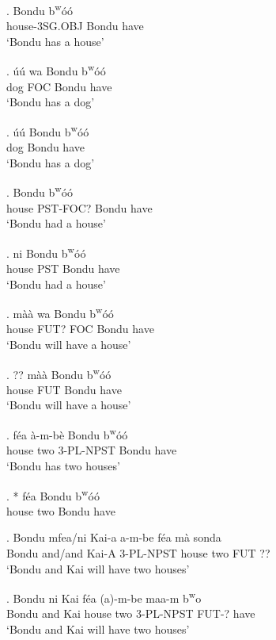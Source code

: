 \documentclass{assets/fieldnotes}
\begin{document}
\exg.  Bondu b\textsuperscript{w}óó\\
house-3SG.OBJ Bondu have\\
`Bondu has a house'

\exg. úú wa Bondu b\textsuperscript{w}óó\\
dog FOC Bondu have\\
`Bondu has a dog'

\exg. úú Bondu b\textsuperscript{w}óó\\
dog Bondu have\\
`Bondu has a dog'

\exg.   Bondu b\textsuperscript{w}óó\\
house PST-FOC? Bondu have\\
`Bondu had a house' 

\exg.  ni Bondu b\textsuperscript{w}óó\\
house PST Bondu have\\
`Bondu had a house'

\exg.  màà wa Bondu b\textsuperscript{w}óó\\
house FUT? FOC Bondu have\\
`Bondu will have a house'

\exg. ?? màà Bondu b\textsuperscript{w}óó\\
house FUT Bondu have\\
`Bondu will have a house'

\exg.  féa à-m-bè Bondu b\textsuperscript{w}óó\\
house two 3-PL-NPST Bondu have\\
\glt `Bondu has two houses'

\ex. * féa Bondu b\textsuperscript{w}óó\\
house two Bondu have\\

\exg. Bondu mfea/ni Kai-a a-m-be  féa mà sonda\\
Bondu and/and Kai-A 3-PL-NPST house two FUT ??\\
`Bondu and Kai will have two houses' \label{sondapl}

\exg. Bondu ni Kai  féa (a)-m-be maa-m b\textsuperscript{w}o\\
Bondu and Kai house two 3-PL-NPST FUT-? have\\
\glt `Bondu and Kai will have two houses'
\end{document}
